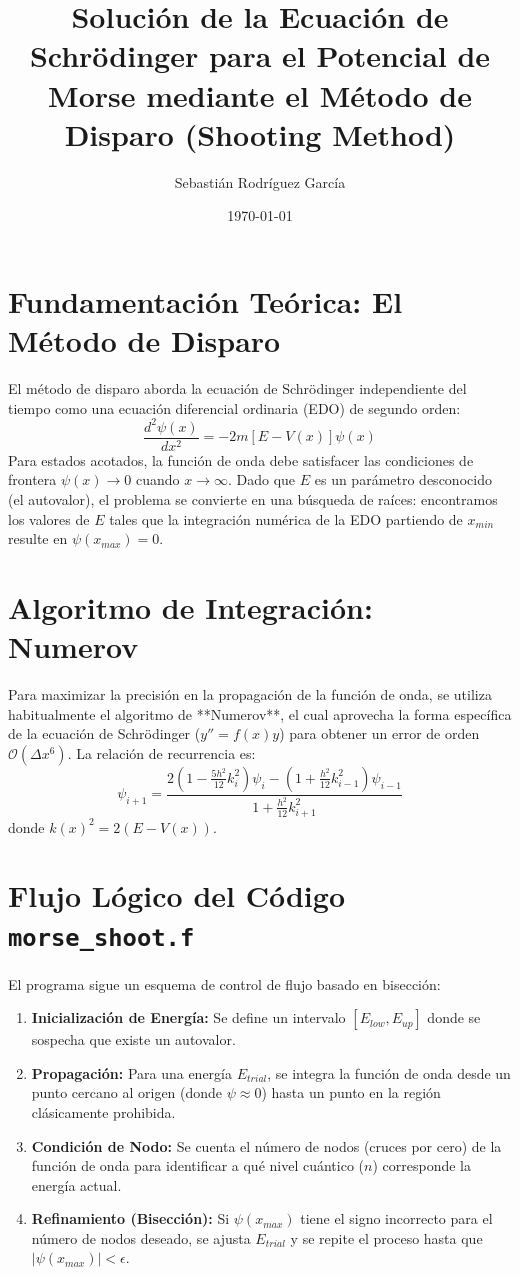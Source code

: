 \documentclass[12pt,a4paper]{article}
\title{Solución de la Ecuación de Schrödinger para el Potencial de Morse mediante el Método de Disparo (Shooting Method)}
\author{Sebastián Rodríguez García}
\date{\today}
\begin{document}
\maketitle

\section{Fundamentación Teórica: El Método de Disparo}
El método de disparo aborda la ecuación de Schrödinger independiente del tiempo como una ecuación diferencial ordinaria (EDO) de segundo orden:
\begin{equation}
\frac{d^2\psi(x)}{dx^2} = -2m [E - V(x)]\psi(x)
\end{equation}
Para estados acotados, la función de onda debe satisfacer las condiciones de frontera $\psi(x) \to 0$ cuando $x \to \infty$. Dado que $E$ es un parámetro desconocido (el autovalor), el problema se convierte en una búsqueda de raíces: encontramos los valores de $E$ tales que la integración numérica de la EDO partiendo de $x_{min}$ resulte en $\psi(x_{max}) = 0$.

\section{Algoritmo de Integración: Numerov}
Para maximizar la precisión en la propagación de la función de onda, se utiliza habitualmente el algoritmo de **Numerov**, el cual aprovecha la forma específica de la ecuación de Schrödinger ($y'' = f(x)y$) para obtener un error de orden $\mathcal{O}(\Delta x^6)$. La relación de recurrencia es:
\begin{equation}
\psi_{i+1} = \frac{2(1 - \frac{5h^2}{12}k_i^2)\psi_i - (1 + \frac{h^2}{12}k_{i-1}^2)\psi_{i-1}}{1 + \frac{h^2}{12}k_{i+1}^2}
\end{equation}
donde $k(x)^2 = 2(E - V(x))$.

\section{Flujo Lógico del Código \texttt{morse\_shoot.f}}
El programa sigue un esquema de control de flujo basado en bisección:

\begin{enumerate}
    \item \textbf{Inicialización de Energía:} Se define un intervalo $[E_{low}, E_{up}]$ donde se sospecha que existe un autovalor.
    \item \textbf{Propagación:} Para una energía $E_{trial}$, se integra la función de onda desde un punto cercano al origen (donde $\psi \approx 0$) hasta un punto en la región clásicamente prohibida.
    \item \textbf{Condición de Nodo:} Se cuenta el número de nodos (cruces por cero) de la función de onda para identificar a qué nivel cuántico ($n$) corresponde la energía actual.
    \item \textbf{Refinamiento (Bisección):} Si $\psi(x_{max})$ tiene el signo incorrecto para el número de nodos deseado, se ajusta $E_{trial}$ y se repite el proceso hasta que $|\psi(x_{max})| < \epsilon$.
\end{enumerate}
\end{document}
